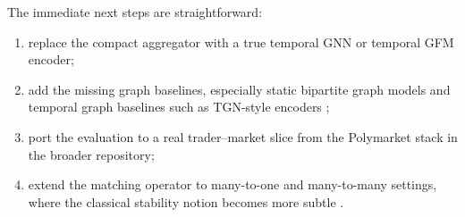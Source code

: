 \documentclass[11pt]{article}
\begin{document}
The immediate next steps are straightforward:
\begin{enumerate}
  \item replace the compact aggregator with a true temporal GNN or temporal GFM
  encoder;
  \item add the missing graph baselines, especially static bipartite graph
  models and temporal graph baselines such as TGN-style encoders
  \citep{rossi2020temporal,trivedi2019dyrep};
  \item port the evaluation to a real trader--market slice from the Polymarket
  stack in the broader repository;
  \item extend the matching operator to many-to-one and many-to-many settings,
  where the classical stability notion becomes more subtle
  \citep{rothsotomayor1990two}.
\end{enumerate}



\end{document}
